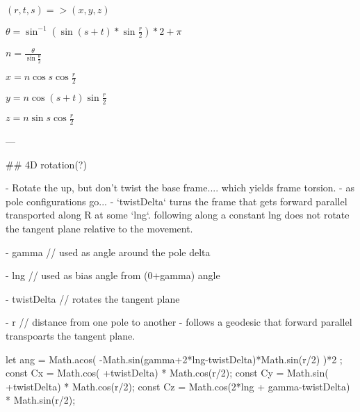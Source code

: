$ (r,t,s) => (x,y,z) $

$\theta = \sin^{-1}( \sin(s+t)*\sin \frac r 2 )*2 + \pi$

$n = \frac \theta { \sin \frac \theta 2 }$ 

$ x = n \cos s \cos \frac r 2 $

$ y = n \cos(s+t)   \sin {\frac r 2}$

$ z = n \sin s \cos \frac r 2 $

---

## 4D rotation(?)

- Rotate the up, but don't twist the base frame.... which yields frame torsion.
- as pole configurations go...
- `twistDelta` turns the frame that gets forward parallel transported along R at some `lng`.   following along a constant lng does not rotate the tangent plane relative to the movement.

- gamma // used as angle around the pole delta

- lng  // used as bias angle from (0+gamma) angle

- twistDelta // rotates the tangent plane

- r   // distance from one pole to another - follows a geodesic that forward parallel transpoarts the tangent plane.


						let ang = Math.acos( -Math.sin(gamma+2*lng-twistDelta)*Math.sin(r/2) )*2 ;
						const Cx = Math.cos( +twistDelta)         * Math.cos(r/2);
						const Cy = Math.sin( +twistDelta)         * Math.cos(r/2);
						const Cz = Math.cos(2*lng + gamma-twistDelta) * Math.sin(r/2);
